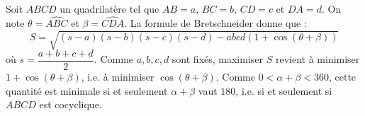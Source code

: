 Soit $ABCD$ un quadrilatère tel que $AB=a$, $BC=b$, $CD=c$ et $DA=d$. On note $\theta=\widehat{ABC}$ et $\beta=\widehat{CDA}$. La formule de Bretschneider donne que :
$$S=\sqrt{(s-a)(s-b)(s-c)(s-d)-abcd(1+\cos(\theta+\beta))}$$
où $s=\dfrac{a+b+c+d}{2}$. Comme $a,b,c,d$ sont fixés, maximiser $S$ revient à minimiser $1+\cos(\theta+\beta)$, i.e. à minimiser $\cos(\theta+\beta)$. Comme $0<\alpha+\beta< 360$, cette quantité est minimale si et seulement $\alpha+\beta$ vaut $180$, i.e. si et seulement si $ABCD$ est cocyclique.